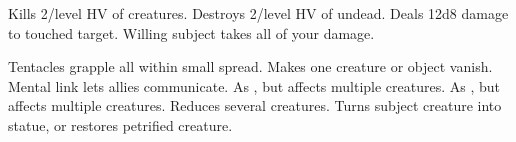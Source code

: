 \begin{swspelllist}
\M Kills 2/level HV of creatures.
\M Destroys 2/level HV of undead.
 Deals 12d8 damage to touched target.
 Willing subject takes all of your damage.

 Tentacles grapple all within small spread.
 Makes one creature or object vanish.
 Mental link lets allies communicate.
 As , but affects multiple creatures.
 As , but affects multiple creatures.
 Reduces several creatures.
 Turns subject creature into statue, or restores petrified creature.
\end{swspelllist}

